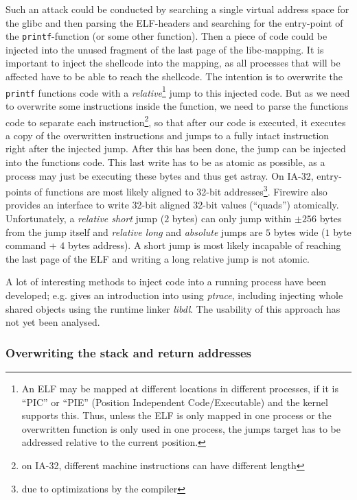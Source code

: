 Such an attack could be conducted by searching a single virtual address space
for the glibc and then parsing the ELF-headers and searching for the entry-point
of the \texttt{printf}-function (or some other function).  Then a piece of code
could be injected into the unused fragment of the last page of the libc-mapping.
It is important to inject the shellcode into the mapping, as all processes that
will be affected have to be able to reach the shellcode.  The intention is to
overwrite the \texttt{printf} functions code with a \emph{relative}\footnote{An
ELF may be mapped at different locations in different processes, if it is
``PIC'' or ``PIE'' (Position Independent Code/Executable) and the kernel
supports this.  Thus, unless the ELF is only mapped in one process or the
overwritten function is only used in one process, the jumps target has to be
addressed relative to the current position.} jump to this injected code.  But as
we need to overwrite some instructions inside the function, we need to parse the
functions code to separate each instruction\footnote{on IA-32, different machine
instructions can have different length}, so that after our code is executed, it
executes a copy of the overwritten instructions and jumps to a fully intact
instruction right after the injected jump. After this has been done, the jump
can be injected into the functions code. This last write has to be as atomic as
possible, as a process may just be executing these bytes and thus get astray.
On IA-32, entry-points of functions are most likely aligned to 32-bit
addresses\footnote{due to optimizations by the compiler}.  Firewire also
provides an interface to write 32-bit aligned 32-bit values (``quads'')
atomically.  Unfortunately, a \emph{relative short} jump ($2$ bytes) can only
jump within $\pm256$ bytes from the jump itself and \emph{relative long} and
\emph{absolute} jumps are $5$ bytes wide ($1$ byte command + $4$ bytes address).
A short jump is most likely incapable of reaching the last page of the ELF and
writing a long relative jump is not atomic.

A lot of interesting methods to inject code into a running process have been
developed; e.g.  \cite{phrack59.8:2002} gives an introduction into using
\emph{ptrace}, including injecting whole shared objects using the runtime linker
\emph{libdl}.  The usability of this approach has not yet been analysed.


\subsubsection{Overwriting the stack and return addresses}

